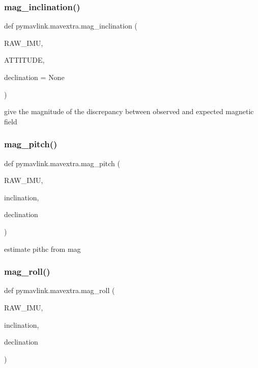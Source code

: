 \subsubsection{\texorpdfstring{mag\+\_\+inclination()}{mag\_inclination()}}
{\footnotesize\ttfamily def pymavlink.\+mavextra.\+mag\+\_\+inclination (\begin{DoxyParamCaption}\item[{}]{R\+A\+W\+\_\+\+I\+MU,  }\item[{}]{A\+T\+T\+I\+T\+U\+DE,  }\item[{}]{declination = {\ttfamily None} }\end{DoxyParamCaption})}

\begin{DoxyVerb}give the magnitude of the discrepancy between observed and expected magnetic field\end{DoxyVerb}
 \mbox{\label{namespacepymavlink_1_1mavextra_a34628d19d224246f6da064562dc71b85}} 
\subsubsection{\texorpdfstring{mag\+\_\+pitch()}{mag\_pitch()}}
{\footnotesize\ttfamily def pymavlink.\+mavextra.\+mag\+\_\+pitch (\begin{DoxyParamCaption}\item[{}]{R\+A\+W\+\_\+\+I\+MU,  }\item[{}]{inclination,  }\item[{}]{declination }\end{DoxyParamCaption})}

\begin{DoxyVerb}estimate pithc from mag\end{DoxyVerb}
 \mbox{\label{namespacepymavlink_1_1mavextra_ae68ad6b7e203ece0fbb43d292c9e4c31}} 
\subsubsection{\texorpdfstring{mag\+\_\+roll()}{mag\_roll()}}
{\footnotesize\ttfamily def pymavlink.\+mavextra.\+mag\+\_\+roll (\begin{DoxyParamCaption}\item[{}]{R\+A\+W\+\_\+\+I\+MU,  }\item[{}]{inclination,  }\item[{}]{declination }\end{DoxyParamCaption})}

